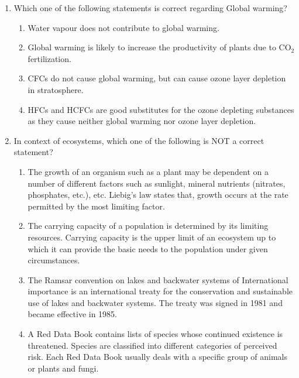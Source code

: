 \documentclass[12pt,a4paper]{article}
\begin{document}
\begin{enumerate}
   \item Which one of the following statements is correct regarding Global warming?
         \begin{enumerate}
            \item Water vapour does not contribute to global warming.
            \item Global warming is likely to increase the productivity of plants due to CO$_2$ fertilization.
            \item CFCs do not cause global warming, but can cause ozone layer depletion in stratosphere.
            \item HFCs and HCFCs are good substitutes for the ozone depleting substances as they cause neither global warming nor ozone layer depletion.
         \end{enumerate}

   \item In context of ecosystems, which one of the following is NOT a correct statement?
         \begin{enumerate}
            \item The growth of an organism such as a plant may be dependent on a number of different factors such as sunlight, mineral nutrients (nitrates, phosphates, etc.), etc. Liebig's law states that, growth occurs at the rate permitted by the most limiting factor.
            \item The carrying capacity of a population is determined by its limiting resources. Carrying capacity is the upper limit of an ecosystem up to which it can provide the basic needs to the population under given circumstances.
            \item The Ramsar convention on lakes and backwater systems of International importance is an international treaty for the conservation and sustainable use of lakes and backwater systems. The treaty was signed in 1981 and became effective in 1985.
            \item A Red Data Book contains lists of species whose continued existence is threatened. Species are classified into different categories of perceived risk. Each Red Data Book usually deals with a specific group of animals or plants and fungi.
         \end{enumerate}


\end{enumerate}
\end{document}
